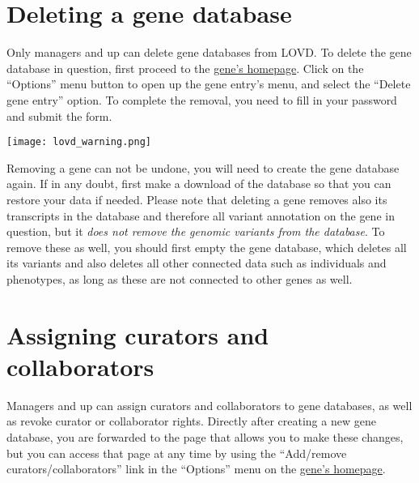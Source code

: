 \documentclass[a4paper,oneside,openany,12pt]{memoir}
\newlength{\infoboxlength}
\newlength{\infoboxinnerlength}
\newenvironment{warntable}
  {\begin{lrbox}{\infobox}%
    \begin{minipage}[t]{1.5cm}
      \centering
      \vspace{0pt}
      \texttt{[image: lovd\_warning.png]}
    \end{minipage}
   \begin{minipage}[t]{\infoboxlength}\vspace{5pt}\begin{minipage}{\infoboxinnerlength}}
  {\vspace{6pt}\end{minipage}\end{minipage}\end{lrbox}%
   \begin{center}
   \fcolorbox{black}{LOVDlight}{\usebox{\infobox}}
   \end{center}}
\renewenvironment{leftbar}[1][\hsize]
{%
    \def\FrameCommand
    {%
        {\color{LOVDdark}\vrule width 3pt \hspace{5pt}}%
        \colorbox{LOVDlight}%
    }%
    \MakeFramed{\hsize#1\advance\hsize-\width\FrameRestore}%
}
{\endMakeFramed}
\begin{document}
\hypertarget{sec:gene_delete}{}
\section{Deleting a gene database}
Only managers and up can delete gene databases from LOVD.
To delete the gene database in question, first proceed to the \hyperlink{sec:gene_homepage}{gene's homepage}.
Click on the ``Options'' menu button to open up the gene entry's menu, and select the ``Delete gene entry'' option.
To complete the removal, you need to fill in your password and submit the form.

\begin{warntable}
Removing a gene can not be undone, you will need to create the gene database again.
If in any doubt, first make a download of the database so that you can restore your data if needed.
Please note that deleting a gene removes also its transcripts in the database and therefore
 all variant annotation on the gene in question, but it \emph{does not remove the genomic variants from the database}.
To remove these as well, you should first empty the gene database, which deletes all its variants and also deletes
 all other connected data such as individuals and phenotypes, as long as these are not connected to other genes as well.
\end{warntable}





\hypertarget{sec:gene_assign_curators}{}
\section{Assigning curators and collaborators}
Managers and up can assign curators and collaborators to gene databases, as well as revoke curator or collaborator rights.
Directly after creating a new gene database, you are forwarded to the page that allows you to make these changes,
 but you can access that page at any time by using the ``Add/remove curators/collaborators'' link in the
 ``Options'' menu on the \hyperlink{sec:gene_homepage}{gene's homepage}.
\end{document}
